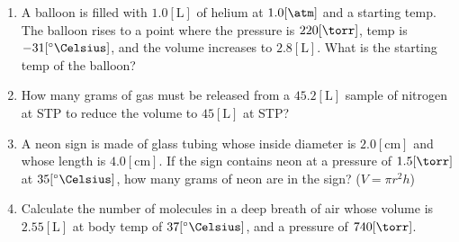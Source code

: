 \documentclass[12pt]{article}
\begin{document}
\begin{enumerate}
    \item A balloon is filled with $1.0[\si{\liter}]$ of helium at $1.0[\si{\atm}]$ and a starting temp.  The balloon rises to a point where the pressure is $220[\si{\torr}]$, temp is $-31[^{\circ}\si{\Celsius}]$, and the volume increases to $2.8[\si{\liter}]$.  What is the starting temp of the balloon? 

    \item How many grams of gas must be released from a $45.2[\si{\liter}]$ sample of nitrogen at STP to reduce the volume to $45[\si{\liter}]$ at STP? 

    \item A neon sign is made of glass tubing whose inside diameter is $2.0[\si{\centi\meter}]$ and whose length is $4.0[\si{\centi\meter}]$.  If the sign contains neon at a pressure of $1.5[\si{\torr}]$ at $35[^{\circ}\si{\Celsius}]$, how many grams of neon are in the sign? ($V=\pi r^2 h$)

    \item Calculate the number of molecules in a deep breath of air whose volume is $2.55[\si{\liter}]$ at body temp of $37[^{\circ}\si{\Celsius}]$, and a pressure of $740[\si{\torr}]$. 

\end{enumerate}
\end{document}
